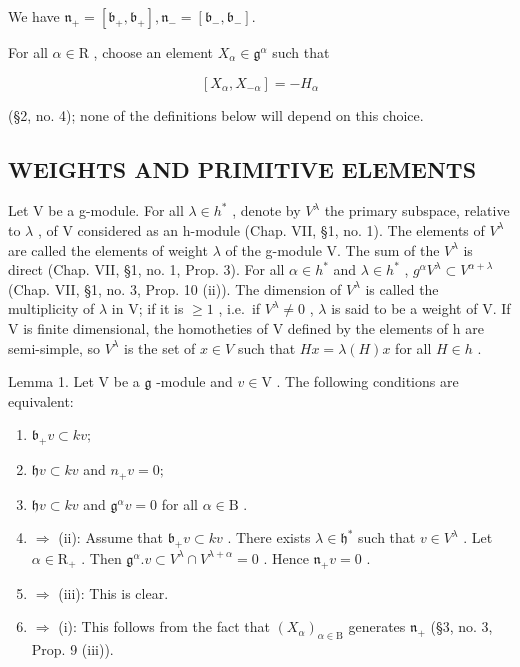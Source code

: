 We have \(\mathfrak{n}_{+} = [\mathfrak{b}_{+},\mathfrak{b}_{+}],\mathfrak{n}_{-} = [\mathfrak{b}_{-},\mathfrak{b}_{-}].\)

For all \(\alpha\in\mathrm{R}\) , choose an element \(X_{\alpha}\in\mathfrak{g}^{\alpha}\) such that

\[
[ X _ {\alpha}, X _ {- \alpha} ] = - H _ {\alpha}
\]

(§2, no. 4); none of the definitions below will depend on this choice.

\subsection{WEIGHTS AND PRIMITIVE ELEMENTS}

Let V be a g-module. For all \(\lambda\in h^{*}\) , denote by \(V^{\lambda}\) the primary subspace, relative to \(\lambda\) , of V considered as an h-module (Chap. VII, §1, no. 1). The elements of \(V^{\lambda}\) are called the elements of weight \(\lambda\) of the g-module V. The sum of the \(V^{\lambda}\) is direct (Chap. VII, §1, no. 1, Prop. 3). For all \(\alpha\in h^{*}\) and \(\lambda\in h^{*}\) , \(g^{\alpha}V^{\lambda}\subset V^{\alpha+\lambda}\) (Chap. VII, §1, no. 3, Prop. 10 (ii)). The dimension of \(V^{\lambda}\) is called the multiplicity of \(\lambda\) in V; if it is \(\geq1\) , i.e.~if \(V^{\lambda}\neq0\) , \(\lambda\) is said to be a weight of V. If V is finite dimensional, the homotheties of V defined by the elements of h are semi-simple, so \(V^{\lambda}\) is the set of \(x\in V\) such that \(Hx=\lambda(H)x\) for all \(H\in h\) .

Lemma 1. Let \(\mathrm{V}\) be a \(\mathfrak{g}\) -module and \(v \in \mathrm{V}\) . The following conditions are equivalent:

\begin{enumerate}
\def\labelenumi{(\roman{enumi})}
\item
  \(\mathfrak{b}_{+}v\subset kv;\)
\item
  \(\mathfrak{h}v \subset kv\) and \(n_{+}v = 0;\)
\item
  \(\mathfrak{h}v\subset kv\) and \(\mathfrak{g}^{\alpha}v = 0\) for all \(\alpha \in \mathrm{B}\) .
\item
  \(\Longrightarrow\) (ii): Assume that \(\mathfrak{b}_{+}v\subset kv\) . There exists \(\lambda \in \mathfrak{h}^*\) such that \(v\in V^{\lambda}\) . Let \(\alpha \in \mathrm{R}_{+}\) . Then \(\mathfrak{g}^{\alpha}.v\subset V^{\lambda}\cap V^{\lambda +\alpha} = 0\) . Hence \(\mathfrak{n}_{+}v = 0\) .
\item
  \(\Longrightarrow\) (iii): This is clear.
\item
  \(\Longrightarrow\) (i): This follows from the fact that \((X_{\alpha})_{\alpha \in \mathrm{B}}\) generates \(\mathfrak{n}_{+}\) (§3, no. 3, Prop. 9 (iii)).
\end{enumerate}

